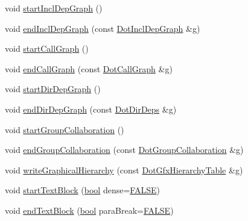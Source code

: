 \begin{DoxyCompactItemize}
\item 
void \hyperlink{class_output_list_a1d3ded0121b9163ac3b11c0bb8e380c4}{start\+Incl\+Dep\+Graph} ()
\item 
void \hyperlink{class_output_list_a547e9f9834f73115ccb47ed553f21334}{end\+Incl\+Dep\+Graph} (const \hyperlink{class_dot_incl_dep_graph}{Dot\+Incl\+Dep\+Graph} \&\hyperlink{060__command__switch_8tcl_af08b4b5bfa9edf0b0a7dee1c2b2c29e0}{g})
\item 
void \hyperlink{class_output_list_a20837aeac45ccb44d354e42e75eb51c9}{start\+Call\+Graph} ()
\item 
void \hyperlink{class_output_list_a2160091a5419feb730f13235a9c9dd35}{end\+Call\+Graph} (const \hyperlink{class_dot_call_graph}{Dot\+Call\+Graph} \&\hyperlink{060__command__switch_8tcl_af08b4b5bfa9edf0b0a7dee1c2b2c29e0}{g})
\item 
void \hyperlink{class_output_list_a6ecc6dca9d8d4bc9720971ffc1c5b788}{start\+Dir\+Dep\+Graph} ()
\item 
void \hyperlink{class_output_list_a69e7c01869fe88fef10d8e1421338df9}{end\+Dir\+Dep\+Graph} (const \hyperlink{class_dot_dir_deps}{Dot\+Dir\+Deps} \&\hyperlink{060__command__switch_8tcl_af08b4b5bfa9edf0b0a7dee1c2b2c29e0}{g})
\item 
void \hyperlink{class_output_list_a41473666261dc8b245cb4daee6bc53a0}{start\+Group\+Collaboration} ()
\item 
void \hyperlink{class_output_list_affe8200bbc33f816a08fac312b5c4f57}{end\+Group\+Collaboration} (const \hyperlink{class_dot_group_collaboration}{Dot\+Group\+Collaboration} \&\hyperlink{060__command__switch_8tcl_af08b4b5bfa9edf0b0a7dee1c2b2c29e0}{g})
\item 
void \hyperlink{class_output_list_aef6975bd197d7c66b5ddbacff8717b61}{write\+Graphical\+Hierarchy} (const \hyperlink{class_dot_gfx_hierarchy_table}{Dot\+Gfx\+Hierarchy\+Table} \&\hyperlink{060__command__switch_8tcl_af08b4b5bfa9edf0b0a7dee1c2b2c29e0}{g})
\item 
void \hyperlink{class_output_list_a5e4b1b0039100083a979ff8d90adce58}{start\+Text\+Block} (\hyperlink{qglobal_8h_a1062901a7428fdd9c7f180f5e01ea056}{bool} dense=\hyperlink{qglobal_8h_a10e004b6916e78ff4ea8379be80b80cc}{F\+A\+L\+S\+E})
\item 
void \hyperlink{class_output_list_a06ee92661f22a8e270e6b1cc538773b5}{end\+Text\+Block} (\hyperlink{qglobal_8h_a1062901a7428fdd9c7f180f5e01ea056}{bool} para\+Break=\hyperlink{qglobal_8h_a10e004b6916e78ff4ea8379be80b80cc}{F\+A\+L\+S\+E})
\item 

\end{DoxyCompactItemize}
